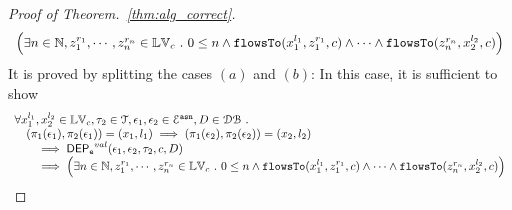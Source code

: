 \begin{proof}[Proof of Theorem.~\ref{thm:alg_correct}]
$$\begin{array}{l}
   \Big(\exists  n \in \mathbb{N}, z_1^{r_1}, \cdots, z_n^{r_n} \in \mathbb{LV}_{{c}} ~.~ 0 \leq n
 \land \mathtt{flowsTo}(x_1^{l_1}, z_1^{r_1}, c) \land \cdots \land \mathtt{flowsTo}(z_n^{r_n}, {x}_2^{l_2}, c) \Big)
\end{array}
$$
%
It is proved by splitting the cases $(a)$ and $(b)$:
%
%
In this case, it is sufficient to show
 \[
\begin{array}{l}
\forall {x}_1^{l_1}, {x}_2^{l_2} \in \mathbb{LV}_{{c}}, \mathtt{\tau}_2 \in \mathcal{T}, 
\mathtt{\epsilon}_1, \mathtt{\epsilon}_2 \in \mathcal{E}^{\mathtt{{asn}}}, D \in \mathcal{DB} ~.~
\\ \quad
(\pi_{1}{(\mathtt{\epsilon}_1)}, \pi_{2}{(\mathtt{\epsilon}_1)}) = ({x}_1, l_1)
\implies
(\pi_{1}{(\mathtt{\epsilon}_2)}, \pi_{2}{(\mathtt{\epsilon}_2)}) = ({x}_2, l_2)
 \\ \qquad \implies 
\mathsf{DEP_{\mathtt{e}}}^{val}(\mathtt{\epsilon}_1, \mathtt{\epsilon}_2, \mathtt{\tau}_2, c, D)
 \\ \qquad \implies
   \Big(\exists  n \in \mathbb{N}, z_1^{r_1}, \cdots, z_n^{r_n} \in \mathbb{LV}_{{c}} ~.~ 0 \leq n
 \land \mathtt{flowsTo}(x_1^{l_1}, z_1^{r_1}, c) \land \cdots \land \mathtt{flowsTo}(z_n^{r_n}, {x}_2^{l_2}, c) \Big)
\end{array}
\]
%

\end{proof}
